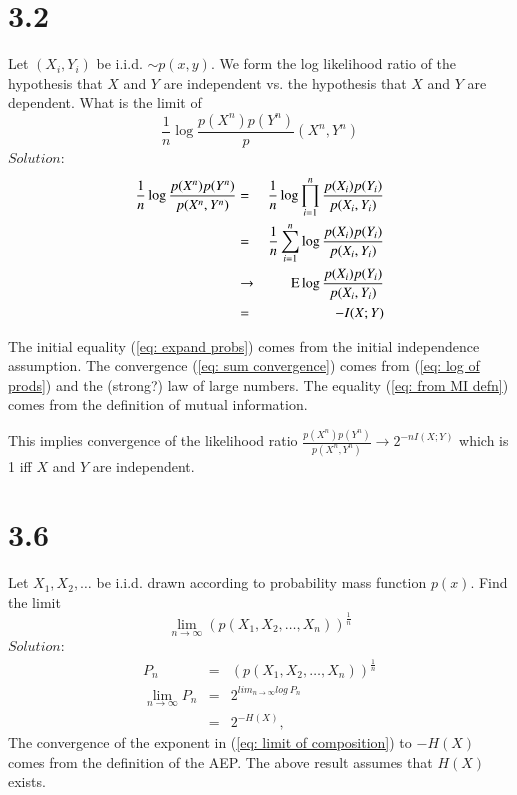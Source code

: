 \documentclass[10pt]{article}
\DeclareMathOperator*{\E}{\mbox{\text{E}}}
\newcommand{\pref}[1]{{(\ref{#1})}}
\begin{document}
\begin{tiny}
\begin{multicols}{3}
\section*{3.2}

Let $(X_i,Y_i)$ be i.i.d. $\sim p(x,y)$. We form the log likelihood ratio
of the hypothesis that $X$ and $Y$ are independent vs. the hypothesis that
$X$ and $Y$ are dependent. What is the limit of
\begin{equation}
    \frac{1}{n}\log \frac{p(X^n)p(Y^n)}p(X^n,Y^n)
    \label{eq: normalized llr}
\end{equation}
$Solution$:
\begin{eqnarray}
    \frac{1}{n}\log \frac{p(X^n)p(Y^n)}{p(X^n,Y^n)}
    &=& \frac{1}{n} \log \prod_{i=1}^{n}\frac{p(X_i)p(Y_i)}{p(X_i,Y_i)}
    \label{eq: expand probs} \\
    &=& \frac{1}{n} \sum_{i=1}^{n} \log \frac{p(X_i)p(Y_i)}{p(X_i,Y_i)}
    \label{eq: log of prods} \\
    &\rightarrow& \E \log \frac{p(X_i)p(Y_i)}{p(X_i,Y_i)} 
    \label{eq: sum convergence} \\
    &=& -I(X;Y) 
    \label{eq: from MI defn}\\
\end{eqnarray}

The initial equality \pref{eq: expand probs} comes from the initial
independence assumption.
The convergence \pref{eq: sum convergence} comes from \pref{eq: log of
prods} and the (strong?) law of large numbers. 
The equality \pref{eq: from MI defn} comes from the
definition of mutual information.

This implies convergence of the likelihood ratio
$\frac{p(X^n)p(Y^n)}{p(X^n,Y^n)} \rightarrow 2^{-nI(X;Y)}$ which is 1 iff
$X$ and $Y$ are independent.

\section*{3.6}

Let $X_1,X_2,\dots$ be i.i.d. drawn according to probability mass function
$p(x)$. Find the limit
\begin{equation}
    \lim_{n \to \infty} (p(X_1,X_2,\dots,X_n))^{\frac{1}{n}}
    \label{eq: aep like limit}
\end{equation}
$Solution$:
\begin{eqnarray}
    P_n &=& (p(X_1,X_2,\dots,X_n))^{\frac{1}{n}}
        \label{eq: defn P_n} \\
    \lim_{n\to \infty} P_n &=& 2^{lim_{n\to\infty}log\ P_n}
        \label{eq: limit of composition} \\
    &=& 2^{-H(X)},
        \label{eq: P_n limit} 
    \end{eqnarray} 
    The convergence of the exponent in \pref{eq: limit of composition} to
    $-H(X)$ comes from the definition of the AEP.
    The above result assumes that $H(X)$ exists.


\end{multicols}
\end{tiny}
\end{document}

